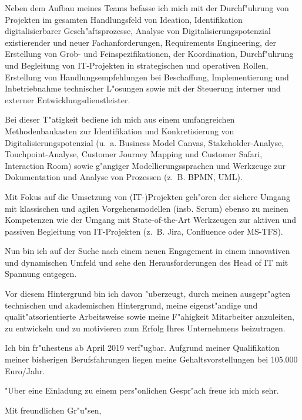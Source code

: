 \documentclass[10pt,a4paper]{dinbrief}
\begin{document}
\begin{letter}
Neben dem Aufbau meines Teams befasse ich mich mit der Durchf"uhrung von Projekten im gesamten Handlungsfeld von Ideation, Identifikation digitalisierbarer Gesch"afts\-prozesse, Analyse von Digitalisierungspotenzial existierender und neuer Fachanforderungen, Requirements Engineering, der Erstellung von Grob- und Feinspezifikationen, der Koordination, Durchf"uhrung und Begleitung von IT-Projekten in strategischen und operativen Rollen, Erstellung von Handlungsempfehlungen bei Beschaffung, Implementierung und Inbetriebnahme technischer L"osungen sowie mit der Steuerung interner und externer Entwicklungsdienstleister. 

Bei dieser T"atigkeit bediene ich mich aus einem umfangreichen Methodenbaukasten zur Identifikation und Konkretisierung von Digitalisierungspotenzial (u.~a. Business Model Canvas, Stakeholder-Analyse, Touchpoint-Analyse, Customer Journey Mapping und Customer Safari, Interaction Room) sowie g"angiger Modellierungssprachen und Werkzeuge zur Dokumentation und Analyse von Prozessen (z.~B. BPMN, UML).

Mit Fokus auf die Umsetzung von (IT-)Projekten geh"oren der sichere Umgang mit klassischen und agilen Vorgehensmodellen (insb. Scrum) ebenso zu meinen Kompetenzen wie der Umgang mit State-of-the-Art Werkzeugen zur aktiven und passiven Begleitung von IT-Projekten (z.~B. Jira, Confluence oder MS-TFS).

Nun bin ich auf der Suche nach einem neuen Engagement in einem innovativen und dynamischen Umfeld und sehe den Herausforderungen des Head of IT mit Spannung entgegen.

Vor diesem Hintergrund bin ich davon "uberzeugt, durch meinen ausgepr"agten technischen und akademischen Hintergrund, meine eigenst"andige und qualit"atsorientierte Arbeitsweise sowie meine F"ahigkeit Mitarbeiter anzuleiten, zu entwickeln und zu motivieren zum Erfolg Ihres Unternehmens beizutragen.

Ich bin fr"uhestens ab April 2019 verf"ugbar. Aufgrund meiner Qualifikation meiner bisherigen Berufsfahrungen liegen meine Gehaltsvorstellungen bei 105.000 Euro/Jahr. 

"Uber eine Einladung zu einem pers"onlichen Gespr"ach freue ich mich sehr.

\closing{Mit freundlichen Gr"u"sen,}
\end{letter}
\end{document}
